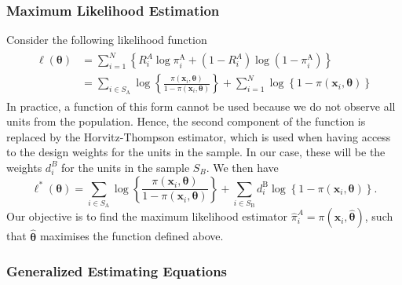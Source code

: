 \documentclass[
]{jss}
\begin{document}
\hypertarget{maximum-likelihood-estimation}{%
\subsubsection{Maximum Likelihood
Estimation}\label{maximum-likelihood-estimation}}

Consider the following likelihood function \begin{align}
    \begin{split}
 \ell(\boldsymbol{\theta}) & =\sum_{i=1}^N\left\{R_i^A \log \pi_i^{\mathrm{A}}+\left(1-R_i^A\right) \log \left(1-\pi_i^{\mathrm{A}}\right)\right\} \\ & =\sum_{i \in S_{\mathrm{A}}} \log \left\{\frac{\pi\left(\boldsymbol{x}_i, \boldsymbol{\theta}\right)}{1-\pi\left(\boldsymbol{x}_i, \boldsymbol{\theta}\right)}\right\}+\sum_{i=1}^N \log \left\{1-\pi\left(\boldsymbol{x}_i, \boldsymbol{\theta}\right)\right\}
    \end{split}
\end{align} In practice, a function of this form cannot be used because
we do not observe all units from the population. Hence, the second
component of the function is replaced by the Horvitz-Thompson estimator,
which is used when having access to the design weights for the units in
the sample. In our case, these will be the weights \(d_i^B\) for the
units in the sample \(S_B\). We then have \begin{equation}
\ell^*(\boldsymbol{\theta})=\sum_{i \in S_{\mathrm{A}}} \log \left\{\frac{\pi\left(\boldsymbol{x}_i, \boldsymbol{\theta}\right)}{1-\pi\left(\boldsymbol{x}_i, \boldsymbol{\theta}\right)}\right\}+\sum_{i \in S_{\mathrm{B}}} d_i^{\mathrm{B}} \log \left\{1-\pi\left(\boldsymbol{x}_i, \boldsymbol{\theta}\right)\right\}.
\end{equation} Our objective is to find the maximum likelihood estimator
\(\hat{\pi}_{i}^{A} = \pi(\boldsymbol{x}_{i}, \hat{\boldsymbol{\theta}})\),
such that \(\hat{\boldsymbol{\theta}}\) maximises the function defined
above.

\hypertarget{generalized-estimating-equations}{%
\subsubsection{Generalized Estimating
Equations}\label{generalized-estimating-equations}}
\end{document}
